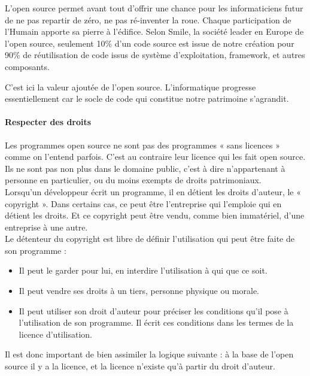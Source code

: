 					L'open source permet avant tout d'offrir une chance pour les informaticiens futur de ne pas repartir de zéro, ne pas ré-inventer la roue. Chaque participation de l'Humain apporte sa pierre à l'édifice.
					Selon Smile, la société leader en Europe de l'open source, seulement 10\% d'un code source est issue de notre création pour 90\% de réutilisation de code issus de système d'exploitation, \gls{framework}, et autres composants.

					C'est ici la valeur ajoutée de l'open source. L'informatique progresse essentiellement car le socle de code qui constitue notre patrimoine s'agrandit.

				\paragraph{Respecter des droits\\}

					Les programmes open source ne sont pas des programmes « sans licences » comme on l'entend parfois. C'est au contraire leur licence qui les fait open source. Ils ne sont pas non plus dans le domaine public, c'est à dire n'appartenant à personne en particulier, ou du moins exempts de droits patrimoniaux.\\
					Lorsqu'un développeur écrit un programme, il en détient les droits d'auteur, le « copyright ». Dans certains cas, ce peut être l'entreprise qui l'emploie qui en détient les droits. Et ce copyright peut être vendu, comme bien immatériel, d'une entreprise à une autre.\\

					Le détenteur du copyright est libre de définir l'utilisation qui peut être faite de son programme : 

					\begin{itemize}[label=\textbullet, font=\LARGE \color{burntorange}]
						\item Il peut le garder pour lui, en interdire l'utilisation à qui que ce soit.
						\item Il peut vendre ses droits à un tiers, personne physique ou morale.
						\item Il peut utiliser son droit d'auteur pour préciser les conditions qu'il pose à l'utilisation de son programme. Il écrit ces conditions dans les termes de la licence d'utilisation.
					\end{itemize}
				
					Il est donc important de bien assimiler la logique suivante : à la base de l'open source il y a la licence, et la licence n'existe qu'à partir du droit d'auteur.\\

